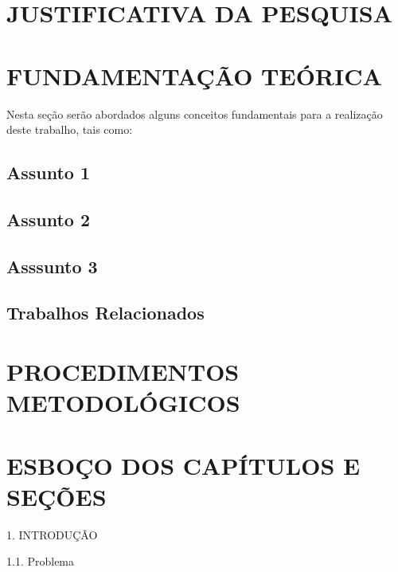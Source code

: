 \documentclass[
    12pt,				       %
    openright,			       %
    oneside,			       %
    a4paper,			       %
    chapter=TITLE,             %
    sumario=tradicional,       %
    english,			        %
    brazil, 				    %
 ]{abntex2}
\begin{document}
\chapter{JUSTIFICATIVA DA PESQUISA}\label{sec:justificativa}



\chapter{FUNDAMENTAÇÃO TEÓRICA}\label{sec:fundamentacao}

Nesta seção serão abordados alguns conceitos fundamentais para a realização deste trabalho, tais como: 



\section{Assunto 1}





\section{Assunto 2}



\section{Asssunto 3}






\section{Trabalhos Relacionados}\label{sec:TrabRel}



\chapter{PROCEDIMENTOS METODOLÓGICOS}



\chapter{ESBOÇO DOS CAPÍTULOS E SEÇÕES}\label{sec:cronograma}


\hspace{0em} 1. INTRODUÇÃO

\hspace{2em} 1.1. Problema
\end{document}
